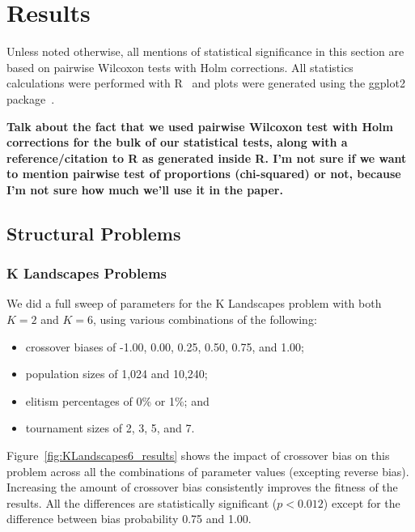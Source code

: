 \documentclass{sig-alternate}
\begin{document}
\section{Results} \label{sec:Results}

Unless noted otherwise, all mentions of statistical significance in this section are based on 
pairwise Wilcoxon tests with Holm corrections. All statistics calculations were performed with R~\cite{R} 
and plots were generated using the ggplot2 package~\cite{ggplot2Book}.

\textbf{Talk about the fact that we used pairwise Wilcoxon test with Holm corrections for the bulk of our statistical 
tests, along with a reference/citation to R as generated inside R. I'm not sure if we want to mention pairwise test of 
proportions (chi-squared) or not, because I'm not sure how much we'll use it in the paper.}

\subsection{Structural Problems}

\subsubsection{K Landscapes Problems}

We did a full sweep of parameters for the K Landscapes problem with both $K=2$ and $K=6$, 
using various combinations of the following:

\begin{itemize}
	\item crossover biases of -1.00, 0.00, 0.25, 0.50, 0.75, and 1.00;
	\item population sizes of 1,024 and 10,240;
	\item elitism percentages of 0\% or 1\%; and
	\item tournament sizes of 2, 3, 5, and 7.
\end{itemize}

Figure~\ref{fig:KLandscapes6_results} shows the impact of crossover bias on this problem across all the combinations of
parameter values (excepting reverse bias). Increasing the amount of crossover bias consistently improves the fitness of
the results. All the differences are statistically significant ($p < 0.012$) except for the difference between bias
probability 0.75 and 1.00.

%
%
%
%
\end{document}
